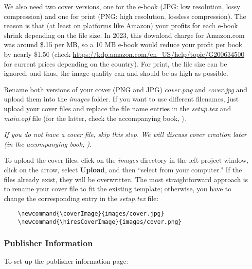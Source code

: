 We also need two cover versions, one for the e-book (JPG: low resolution, lossy compression) and one for print (PNG: high resolution, lossless compression). The reason is that (at least on platforms like Amazon) your profits for each e-book shrink depending on the file size. In 2023, this download charge for Amazon.com was around \${}.15 per MB, so a 10 MB e-book would reduce your profit per book by nearly \${}1.50 (check \url{https://kdp.amazon.com/en_US/help/topic/G200634500} for current prices depending on the country). For print, the file size can be ignored, and thus, the image quality can and should be as high as possible. 

Rename both versions of your cover (PNG and JPG) \textit{cover.png} and \textit{cover.jpg} and upload them into the \textit{images} folder. If you want to use different filenames, just upload your cover files and replace the file name entries in the \textit{setup.tex} and \textit{main.opf} file (for the latter, check the accompanying book, ).

\textit{If you do not have a cover file, skip this step. We will discuss cover creation later (in the accompanying book, ).}

To upload the cover files, click on the \textit{images} directory in the left project window, click on the arrow, select \textbf{Upload}, and then ``select from your computer.'' If the files already exist, they will be overwritten. The most straightforward approach is to rename your cover file to fit the existing template; otherwise, you have to change the corresponding entry in the \textit{setup.tex} file:

\begin{lstlisting}
    \newcommand{\coverImage}{images/cover.jpg}
    \newcommand{\hiresCoverImage}{images/cover.png}
\end{lstlisting}



\subsubsection{Publisher Information}

To set up the publisher information page:

